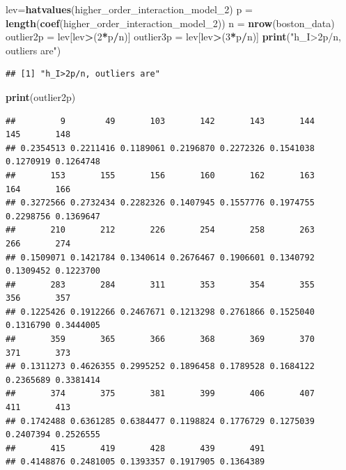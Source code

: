 \documentclass[
]{article}
\newenvironment{Shaded}{\begin{snugshade}}{\end{snugshade}}
\newcommand{\DecValTok}[1]{\textcolor[rgb]{0.00,0.00,0.81}{#1}}
\newcommand{\FunctionTok}[1]{\textcolor[rgb]{0.13,0.29,0.53}{\textbf{#1}}}
\newcommand{\NormalTok}[1]{#1}
\newcommand{\OtherTok}[1]{\textcolor[rgb]{0.56,0.35,0.01}{#1}}
\newcommand{\SpecialCharTok}[1]{\textcolor[rgb]{0.81,0.36,0.00}{\textbf{#1}}}
\newcommand{\StringTok}[1]{\textcolor[rgb]{0.31,0.60,0.02}{#1}}
\begin{document}
\begin{Shaded}
\begin{Highlighting}[]
\NormalTok{lev}\OtherTok{=}\FunctionTok{hatvalues}\NormalTok{(higher\_order\_interaction\_model\_2)}
\NormalTok{p }\OtherTok{=} \FunctionTok{length}\NormalTok{(}\FunctionTok{coef}\NormalTok{(higher\_order\_interaction\_model\_2))}
\NormalTok{n }\OtherTok{=} \FunctionTok{nrow}\NormalTok{(boston\_data)}
\NormalTok{outlier2p }\OtherTok{=}\NormalTok{ lev[lev}\SpecialCharTok{\textgreater{}}\NormalTok{(}\DecValTok{2}\SpecialCharTok{*}\NormalTok{p}\SpecialCharTok{/}\NormalTok{n)]}
\NormalTok{outlier3p }\OtherTok{=}\NormalTok{ lev[lev}\SpecialCharTok{\textgreater{}}\NormalTok{(}\DecValTok{3}\SpecialCharTok{*}\NormalTok{p}\SpecialCharTok{/}\NormalTok{n)]}
\FunctionTok{print}\NormalTok{(}\StringTok{"h\_I\textgreater{}2p/n, outliers are"}\NormalTok{)}
\end{Highlighting}
\end{Shaded}

\begin{verbatim}
## [1] "h_I>2p/n, outliers are"
\end{verbatim}

\begin{Shaded}
\begin{Highlighting}[]
\FunctionTok{print}\NormalTok{(outlier2p)}
\end{Highlighting}
\end{Shaded}

\begin{verbatim}
##         9        49       103       142       143       144       145       148 
## 0.2354513 0.2211416 0.1189061 0.2196870 0.2272326 0.1541038 0.1270919 0.1264748 
##       153       155       156       160       162       163       164       166 
## 0.3272566 0.2732434 0.2282326 0.1407945 0.1557776 0.1974755 0.2298756 0.1369647 
##       210       212       226       254       258       263       266       274 
## 0.1509071 0.1421784 0.1340614 0.2676467 0.1906601 0.1340792 0.1309452 0.1223700 
##       283       284       311       353       354       355       356       357 
## 0.1225426 0.1912266 0.2467671 0.1213298 0.2761866 0.1525040 0.1316790 0.3444005 
##       359       365       366       368       369       370       371       373 
## 0.1311273 0.4626355 0.2995252 0.1896458 0.1789528 0.1684122 0.2365689 0.3381414 
##       374       375       381       399       406       407       411       413 
## 0.1742488 0.6361285 0.6384477 0.1198824 0.1776729 0.1275039 0.2407394 0.2526555 
##       415       419       428       439       491 
## 0.4148876 0.2481005 0.1393357 0.1917905 0.1364389
\end{verbatim}
\end{document}
